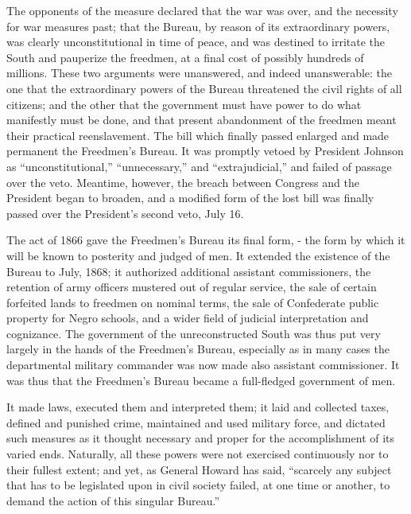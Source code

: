 The opponents of the measure declared that the war was over, and the necessity for war measures past; that the Bureau, by reason of its extraordinary powers, was clearly unconstitutional in time of peace, and was destined to irritate the South and pauperize the freedmen, at a final cost of possibly hundreds of millions. These two arguments were unanswered, and indeed unanswerable: the one that the extraordinary powers of the Bureau threatened the civil rights of all citizens; and the other that the government must have power to do what manifestly must be done, and that present abandonment of the freedmen meant their practical reenslavement. The bill which finally passed enlarged and made permanent the Freedmen’s Bureau. It was promptly vetoed by President Johnson as “unconstitutional,” “unnecessary,” and “extrajudicial,” and failed of passage over the veto. Meantime, however, the breach between Congress and the President began to broaden, and a modified form of the lost bill was finally passed over the President’s second veto, July 16.\par

The act of 1866 gave the Freedmen’s Bureau its final form, - the form by which it will be known to posterity and judged of men. It extended the existence of the Bureau to July, 1868; it authorized additional assistant commissioners, the retention of army officers mustered out of regular service, the sale of certain forfeited lands to freedmen on nominal terms, the sale of Confederate public property for Negro schools, and a wider field of judicial interpretation and cognizance. The government of the unreconstructed South was thus put very largely in the hands of the Freedmen’s Bureau, especially as in many cases the departmental military commander was now made also assistant commissioner. It was thus that the Freedmen’s Bureau became a full-fledged government of men.\par

It made laws, executed them and interpreted them; it laid and collected taxes, defined and punished crime, maintained and used military force, and dictated such measures as it thought necessary and proper for the accomplishment of its varied ends. Naturally, all these powers were not exercised continuously nor to their fullest extent; and yet, as General Howard has said, “scarcely any subject that has to be legislated upon in civil society failed, at one time or another, to demand the action of this singular Bureau.”\par

